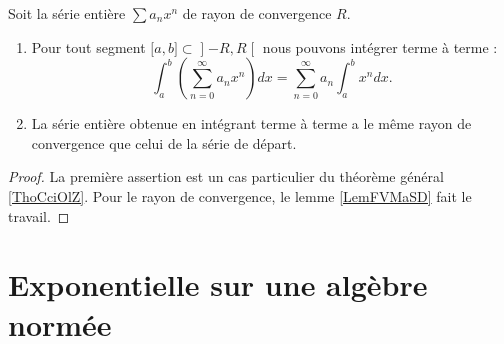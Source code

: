 \begin{proposition} \label{PropfeFQWr}
    Soit la série entière $\sum a_nx^n$ de rayon de convergence \( R\). 
    \begin{enumerate}
        \item
            Pour tout segment \( \mathopen[ a , b \mathclose]\subset\mathopen] -R , R \mathclose[\) nous pouvons intégrer terme à terme :
            \begin{equation}
                \int_a^b\left( \sum_{n=0}^{\infty}a_nx^n\right)dx=\sum_{n=0}^{\infty}a_n\int_a^bx^ndx.
            \end{equation}
        \item
            La série entière obtenue en intégrant terme à terme a le même rayon de convergence que celui de la série de départ.
    \end{enumerate}
\end{proposition}

\begin{proof}
    La première assertion est un cas particulier du théorème général \ref{ThoCciOlZ}. Pour le rayon de convergence, le lemme \ref{LemFVMaSD} fait le travail.
\end{proof}

\section{Exponentielle sur une algèbre normée}

